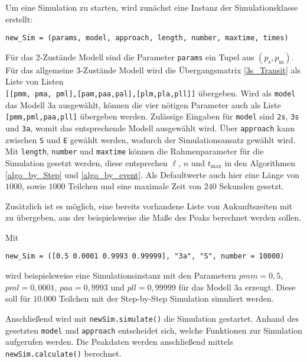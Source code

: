 Um eine Simulation zu starten, wird zunächst eine Instanz der Simulationsklasse erstellt:
\begin{verbatim}
new_Sim = (params, model, approach, length, number, maxtime, times)
\end{verbatim}                                                                                                  
Für das 2-Zustände Modell sind die Parameter \verb!params! ein Tupel aus $(p_\text{s}, p_\text{m})$. Für das allgemeine 3-Zustände Modell wird die Übergangsmatrix \ref{3s_Transit} als Liste von Listen \\ \verb![[pmm, pma, pml],[pam,paa,pal],[plm,pla,pll]]! übergeben. Wird als \verb!model! das Modell 3a ausgewählt, können die vier nötigen Parameter auch als Liste \verb![pmm,pml,paa,pll]! übergeben werden.
Zulässige Eingaben für \verb!model! sind \texttt{2s}, \texttt{3s} und \texttt{3a}, womit das entsprechende Modell ausgewählt wird. Über \verb!approach! kann zwischen \texttt{S} und \texttt{E} gewählt werden, wodurch der Simulationsansatz gewählt wird.
Mit \verb!length!, \verb!number! und \verb!maxtime! können die Rahmenparameter für die Simulation gesetzt werden, diese entsprechen $\ell$, $n$ und $t_{\text{max}}$ in den Algorithmen \ref{algo_by_Step} und \ref{algo_by_event}. Als Defaultwerte auch hier eine Länge von $1000$, sowie $1000$ Teilchen und eine maximale Zeit von $240$ Sekunden gesetzt.

Zusätzlich ist es möglich, eine bereits vorhandene Liste von Ankunftszeiten mit zu übergeben, aus der beispielsweise die Maße des Peaks berechnet werden sollen.

Mit \begin{verbatim}
new_Sim = ([0.5 0.0001 0.9993 0.99999], "3a", "S", number = 10000)
\end{verbatim} 
wird beispielsweise eine Simulationsinstanz mit den Parametern $pmm = 0,5$, $pml = 0,0001$, $paa = 0,9993$ und $pll = 0,99999$ für das Modell 3a erzeugt. Diese soll für $10.000$ Teilchen mit der Step-by-Step Simulation simuliert werden.

Anschließend wird mit \verb!newSim.simulate()! die Simulation gestartet. Anhand des gesetzten \verb!model! und \verb!approach! entscheidet sich, welche Funktionen zur Simulation aufgerufen werden. Die Peakdaten werden anschließend mittels \verb!newSim.calculate()! berechnet.

